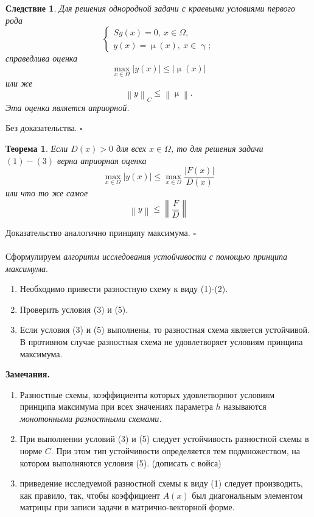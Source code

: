 \documentclass[a4paper, 12pt]{report}
\numberwithin{equation}{section}
\newenvironment{Proof} %
{\par\noindent{$\blacklozenge$}} %
{\hfill$\scriptstyle\square$}
\renewcommand{\leq}{\leqslant}
\renewcommand{\gamma}{\upgamma}
\renewcommand{\mu}{\upmu}
\newcommand\Norm[1]{\left\| #1 \right\|}
\newtheorem*{theorem}{Теорема}
\newtheorem*{cor}{Следствие}
\begin{document}
		\begin{cor}
			Для решения однородной задачи с краевыми условиями первого рода
			$$\begin{cases}
				Sy(x) = 0,\ x\in \Omega,\\
				y(x) = \mu(x),\ x \in \gamma;
			\end{cases}$$
			справедлива оценка
			$$\underset{x \in \Omega}{\max} |y(x)| \leq |\mu(x)|$$
			или же
			\begin{equation}
				\Norm{y}_C \leq \Norm{\mu}.
			\end{equation}
			Эта оценка является априорной.
		\end{cor}
		\begin{Proof}
			Без доказательства.
		\end{Proof}
		 \begin{theorem}
		 	Если $D(x)>0$ для всех $x \in \Omega$, то для решения задачи $(1)-(3)$ верна априорная оценка
		 	$$\underset{x \in \Omega}{\max}|y(x)| \leq \underset{x \in \Omega}{\max} \dfrac{|F(x)|}{D(x)}$$
		 	или что то же самое
		 	\begin{equation}
		 		\Norm{y}\leq \Norm{\dfrac{F}{D}}
		 	\end{equation}
		 \end{theorem}
		 \begin{Proof}
		 	Доказательство аналогично принципу максимума.
		 \end{Proof}\\\\
		 Сформулируем \textit{алгоритм исследования устойчивости с помощью принципа максимума}.
		 \begin{enumerate}
		 	\item Необходимо привести разностную схему к виду (1)-(2).
		 	\item Проверить условия (3) и (5).
		 	\item Если условия (3) и (5) выполнены, то разностная схема является устойчивой. В противном случае разностная схема не удовлетворяет условиям принципа максимума.
		 \end{enumerate}
		 \textbf{Замечания.}
		 \begin{enumerate}
		 	\item Разностные схемы, коэффициенты которых удовлетворяют условиям принципа максимума при всех значениях параметра $h$ называются \textit{монотонными разностными схемами.}
		 	\item При выполнении условий (3) и (5) следует устойчивость разностной схемы в норме $C$. При этом тип устойчивости определяется тем подмножеством, на котором выполняются условия (5). (дописать с войса)
		 	\item приведение исследуемой разностной схемы к виду (1) следует производить, как правило, так, чтобы коэффициент $A(x)$ был диагональным элементом матрицы при записи задачи в матрично-векторной форме.
		 \end{enumerate}
\end{document}
